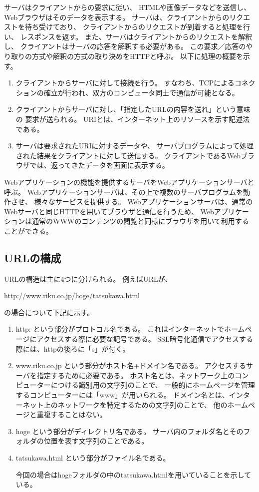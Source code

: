 \documentclass[12pt]{jarticle}
\begin{document}
サーバはクライアントからの要求に従い、
HTMLや画像データなどを送信し、
Webブラウザはそのデータを表示する。
サーバは、クライアントからのリクエストを待ち受けており、
クライアントからのリクエストが到着すると処理を行い、
レスポンスを返す。
また、サーバはクライアントからのリクエストを解釈し、
クライアントはサーバの応答を解釈する必要がある。
この要求／応答のやり取りの方式や解釈の方式の取り決めをHTTPと呼ぶ。
以下に処理の概要を示す。
\begin{enumerate}
    \item クライアントからサーバに対して接続を行う。
          すなわち、TCPによるコネクションの確立が行われ、双方のコンピュータ同士で通信が可能となる。
    \item クライアントからサーバに対し、「指定したURLの内容を送れ」という意味の
          要求が送られる。
          URIとは、インターネット上のリソースを示す記述法である。
    \item サーバは要求されたURIに対するデータや、
          サーバプログラムによって処理された結果をクライアントに対して送信する。
          クライアントであるWebブラウザでは、返ってきたデータを画面に表示する。
\end{enumerate}

\clearpage

Webアプリケーションの機能を提供するサーバをWebアプリケーションサーバと呼ぶ。
Webアプリケーションサーバは、その上で複数のサーバプログラムを動作させ、
様々なサービスを提供する。
Webアプリケーションサーバは、通常のWebサーバと同じHTTPを用いてブラウザと通信を行うため、
Webアプリケーションは通常のWWWのコンテンツの閲覧と同様にブラウザを用いて利用することができる。

\subsection{URLの構成}
URLの構造は主に4つに分けられる。
例えばURLが、
\begin{center}
    http://www.riku.co.jp/hoge/tatsukawa.html
\end{center}
の場合について下記に示す。
\begin{enumerate}
    \item http: という部分がプロトコル名である。
          これはインターネットでホームページにアクセスする際に必要な記号である。
          SSL暗号化通信でアクセスする際には、httpの後ろに「s」が付く。
    \item www.riku.co.jp という部分がホスト名+ドメイン名である。
          アクセスするサーバを指定するために必要である。
          ホスト名とは、ネットワーク上のコンピューターにつける識別用の文字列のことで、
          一般的にホームページを管理するコンピューターには「www」が用いられる。
          ドメイン名とは、インターネット上のネットワークを特定するための文字列のことで、
          他のホームページと重複することはない。
    \item hoge という部分がディレクトリ名である。
          サーバ内のフォルダ名とそのフォルダの位置を表す文字列のことである。
    \item tatsukawa.html という部分がファイル名である。

          今回の場合はhogeフォルダの中のtatsukawa.htmlを用いていることを示している。
\end{enumerate}
\end{document}
